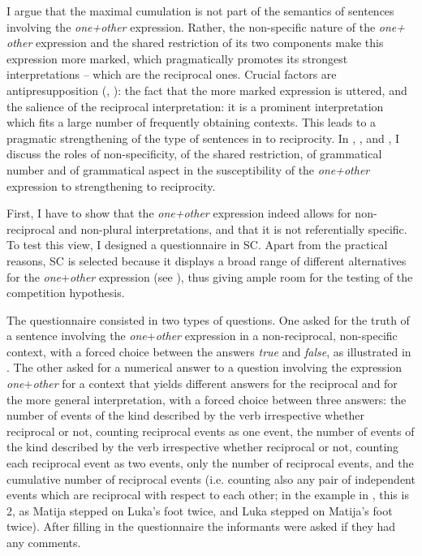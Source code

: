 \documentclass[output=paper,colorlinks,citecolor=brown]{langscibook}
\begin{document}
I argue that the maximal cumulation is not part of the semantics of sentences involving the \textit{one+other} expression. Rather, the non-specific nature of the \textit{one+ other} expression and the shared restriction of its two components make this expression more marked, which pragmatically promotes its strongest interpretations -- which are the reciprocal ones. Crucial factors are antipresupposition (\citealt{h91}, \citealt{p06}): the fact that the more marked expression is uttered, and the salience of the reciprocal interpretation: it is a prominent interpretation which fits a large number of frequently obtaining contexts. This leads to a pragmatic strengthening of the type of sentences in  to reciprocity. In , , and , %
I discuss the roles of non-specificity, of the shared restriction, of grammatical number and of grammatical aspect in the susceptibility of the \textit{one+other} expression to strengthening to reciprocity.

First, I have to show that the \textit{one+other} expression indeed allows for non-reciprocal and non-plural interpretations, and that it is not referentially specific. To test this view, I designed a questionnaire in SC. Apart from the practical reasons, SC is selected because it displays a broad range of different alternatives for the \textit{one}+\textit{other} expression (see ), thus giving ample room for the testing of the competition hypothesis. 

The questionnaire consisted in two types of questions. One asked for the truth of a sentence involving the \textit{one}+\textit{other} expression in a non-reciprocal, non-specific context, with a forced choice between the answers \textit{true} and \textit{false}, as illustrated in . The other asked for a numerical answer to a question involving the expression \textit{one}+\textit{other} for a context that yields different answers for the reciprocal and for the more general interpretation, with a forced choice between three answers: the number of events of the kind described by the verb irrespective whether reciprocal or not, counting reciprocal events as one event, the number of events of the kind described by the verb irrespective whether reciprocal or not, counting each reciprocal event as two events, only the number of reciprocal events, and the cumulative number of reciprocal events (i.e. counting also any pair of independent events which are reciprocal with respect to each other; in the example in , this is 2, as Matija stepped on Luka's foot twice, and Luka stepped on Matija's foot twice). After filling in the questionnaire the informants were asked if they had any comments. 
\end{document}
